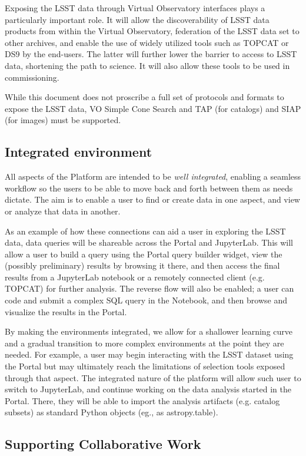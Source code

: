 \documentclass[DM,lsstdraft,toc]{lsstdoc}
\begin{document}
Exposing the LSST data through Virtual Observatory interfaces plays a particularly 
important role. It will allow the discoverability of LSST data products from within
the Virtual Observatory, federation of the LSST data set to other
archives, and enable the use of widely utilized tools such as TOPCAT or DS9 by the
end-users. The latter will further lower the barrier to access to LSST data, 
shortening the path to science. It will also allow these tools to be used in commissioning.

While this document does not proscribe a full set of protocols and formats
to expose the LSST data, VO Simple Cone Search and TAP (for catalogs) and
SIAP (for images) must be supported.

\subsection{Integrated environment}

All aspects of the Platform are intended to be {\it well integrated}, enabling a seamless workflow so the users to be able to move back and forth between them as needs dictate.  The aim is to enable a user to find or create data in one aspect, and view or analyze that data in another.

As an example of how these connections can aid a user in exploring the LSST data, data queries will be shareable across the Portal and JupyterLab. This will allow a user to build a query using the Portal query builder widget, view the (possibly preliminary) results by browsing it there, and then access the final results from a JupyterLab notebook or a remotely connected client (e.g. TOPCAT) for further analysis. The reverse flow will also be enabled; a user can code and submit a complex SQL query in the Notebook, and then browse and visualize the results in the Portal.

By making the environments integrated, we allow for a shallower learning curve and a gradual transition to more complex environments at the point they are needed. For example, a user may begin interacting with the LSST dataset using the Portal but may ultimately reach the limitations of selection tools exposed through that aspect. The integrated nature of the platform will allow such user to switch to JupyterLab, and continue working on the data analysis started in the Portal. There, they will be able to import the analysis artifacts (e.g. catalog subsets) as standard Python objects (eg., as astropy.table).

\subsection{Supporting Collaborative Work\label{sec:collab}}
\end{document}
